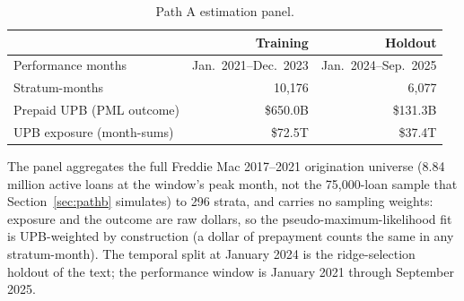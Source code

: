 \documentclass[12pt]{article}
\begin{document}
\begin{table}[H]
\centering
\small
\begin{threeparttable}
\caption{Path A estimation panel.}
\label{tab:panel}
\begin{tabular}{@{}lrr@{}}
\toprule
 & Training & Holdout \\
\midrule
Performance months & Jan.\ 2021--Dec.\ 2023 & Jan.\ 2024--Sep.\ 2025 \\
Stratum-months & 10,176 & 6,077 \\
Prepaid UPB (PML outcome) & \$650.0B & \$131.3B \\
UPB exposure (month-sums) & \$72.5T & \$37.4T \\
\bottomrule
\end{tabular}
\begin{tablenotes}[flushleft]\footnotesize
\item The panel aggregates the full Freddie Mac 2017--2021 origination universe (8.84 million active loans at the window's peak month, not the 75,000-loan sample that Section~\ref{sec:pathb} simulates) to 296 strata, and carries no sampling weights: exposure and the outcome are raw dollars, so the pseudo-maximum-likelihood fit is UPB-weighted by construction (a dollar of prepayment counts the same in any stratum-month). The temporal split at January 2024 is the ridge-selection holdout of the text; the performance window is January 2021 through September 2025.
\end{tablenotes}
\end{threeparttable}
\end{table}
\end{document}
